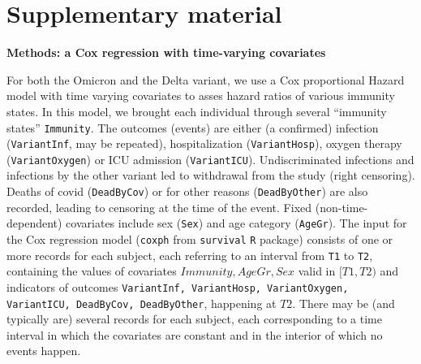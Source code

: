 \documentclass[preprint,12pt,authoryear]{elsarticle}
\begin{document}





\newpage

\section*{Supplementary material}

\setcounter{table}{0}
\renewcommand{\thetable}{S\arabic{table}}
\setcounter{figure}{0}
\renewcommand{\thefigure}{S\arabic{figure}}



\noindent
{\bf Methods: a Cox regression with time-varying covariates}

For both the Omicron and the Delta variant, we use a Cox proportional Hazard model with time varying covariates to asses hazard ratios of various immunity states. In this model,
we brought each individual through several ``immunity states'' {\tt Immunity}. The outcomes (events) are either (a confirmed) infection ({\tt VariantInf}, may be repeated), hospitalization ({\tt VariantHosp}), oxygen therapy ({\tt VariantOxygen}) or ICU admission ({\tt VariantICU}). Undiscriminated infections and infections by the other variant led to withdrawal from the study (right censoring). 
Deaths of covid ({\tt DeadByCov}) or for other reasons ({\tt DeadByOther}) are also recorded, leading to censoring at the time of the event. Fixed (non-time-dependent) covariates include sex ({\tt Sex}) and age category ({\tt AgeGr}). The input for the Cox regression model ({\tt coxph} from {\tt survival} {\tt R} package) consists of one or more records for each subject, each referring to an interval from {\tt T1} to {\tt T2}, containing the values of covariates $Immunity,AgeGr,Sex$ valid in $[T1,T2)$ and indicators of outcomes {\tt VariantInf, VariantHosp, VariantOxygen, VariantICU, DeadByCov, DeadByOther}, happening at $T2$. There may be (and typically are) several records for each subject, each corresponding to a time interval in which the covariates are constant and in the interior of which no events happen.
\end{document}
